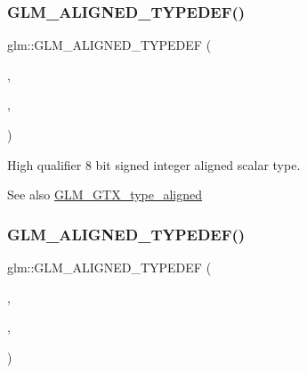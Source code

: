 \subsubsection{\texorpdfstring{G\+L\+M\+\_\+\+A\+L\+I\+G\+N\+E\+D\+\_\+\+T\+Y\+P\+E\+D\+E\+F()}{GLM\_ALIGNED\_TYPEDEF()}\hspace{0.1cm}{\footnotesize\ttfamily [33/209]}}
{\footnotesize\ttfamily glm\+::\+G\+L\+M\+\_\+\+A\+L\+I\+G\+N\+E\+D\+\_\+\+T\+Y\+P\+E\+D\+EF (\begin{DoxyParamCaption}\item[{\mbox{\hyperlink{group__gtc__type__precision_ga8b9eb0b24cce7f14478bfcacb53ce839}{highp\+\_\+i8}}}]{,  }\item[{aligned\+\_\+highp\+\_\+i8}]{,  }\item[{1}]{ }\end{DoxyParamCaption})}

High qualifier 8 bit signed integer aligned scalar type. \begin{DoxySeeAlso}{See also}
\mbox{\hyperlink{group__gtx__type__aligned}{G\+L\+M\+\_\+\+G\+T\+X\+\_\+type\+\_\+aligned}} 
\end{DoxySeeAlso}
\mbox{\label{group__gtx__type__aligned_gae6d384de17588d8edb894fbe06e0d410}} 
\subsubsection{\texorpdfstring{G\+L\+M\+\_\+\+A\+L\+I\+G\+N\+E\+D\+\_\+\+T\+Y\+P\+E\+D\+E\+F()}{GLM\_ALIGNED\_TYPEDEF()}\hspace{0.1cm}{\footnotesize\ttfamily [34/209]}}
{\footnotesize\ttfamily glm\+::\+G\+L\+M\+\_\+\+A\+L\+I\+G\+N\+E\+D\+\_\+\+T\+Y\+P\+E\+D\+EF (\begin{DoxyParamCaption}\item[{\mbox{\hyperlink{group__gtc__type__precision_gaa04399853952dbce29cb62e2432f350a}{highp\+\_\+i16}}}]{,  }\item[{aligned\+\_\+highp\+\_\+i16}]{,  }\item[{2}]{ }\end{DoxyParamCaption})}

